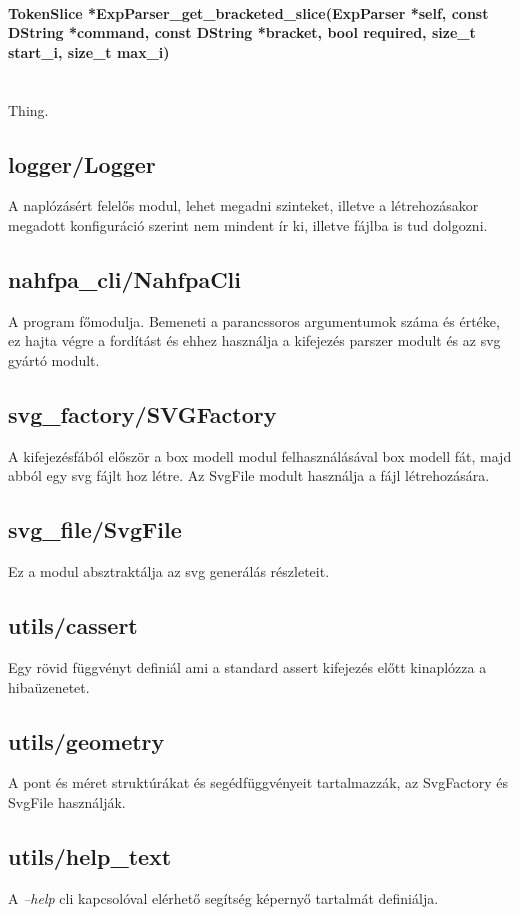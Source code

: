 \documentclass{article}[12pt,a4paper]
\newcommand{\lang}[1]{\textit{#1}}
\newcommand{\fn}[1]{\paragraph{#1}\mbox{}\\}
\begin{document}
    \fn{TokenSlice *ExpParser_get_bracketed_slice(ExpParser *self, const DString *command, const DString *bracket, bool required, size_t start_i, size_t max_i)}
    Thing.

    \subsection{logger/Logger}
    A naplózásért felelős modul, lehet megadni szinteket, illetve a létrehozásakor megadott konfiguráció szerint nem mindent ír ki, illetve fájlba is tud dolgozni.

    \subsection{nahfpa\_cli/NahfpaCli}
    A program főmodulja.
    Bemeneti a parancssoros argumentumok száma és értéke, ez hajta végre a fordítást és ehhez használja a kifejezés parszer modult és az svg gyártó modult.

    \subsection{svg\_factory/SVGFactory}
    A kifejezésfából először a box modell modul felhasználásával box modell fát, majd abból egy svg fájlt hoz létre.
    Az SvgFile modult használja a fájl létrehozására.

    \subsection{svg\_file/SvgFile}
    Ez a modul absztraktálja az svg generálás részleteit.

    \subsection{utils/cassert}
    Egy rövid függvényt definiál ami a standard assert kifejezés előtt kinaplózza a hibaüzenetet.

    \subsection{utils/geometry}
    A pont és méret struktúrákat és segédfüggvényeit tartalmazzák, az SvgFactory és SvgFile használják.

    \subsection{utils/help\_text}
    A \lang{--help} cli kapcsolóval elérhető segítség képernyő tartalmát definiálja.
\end{document}

